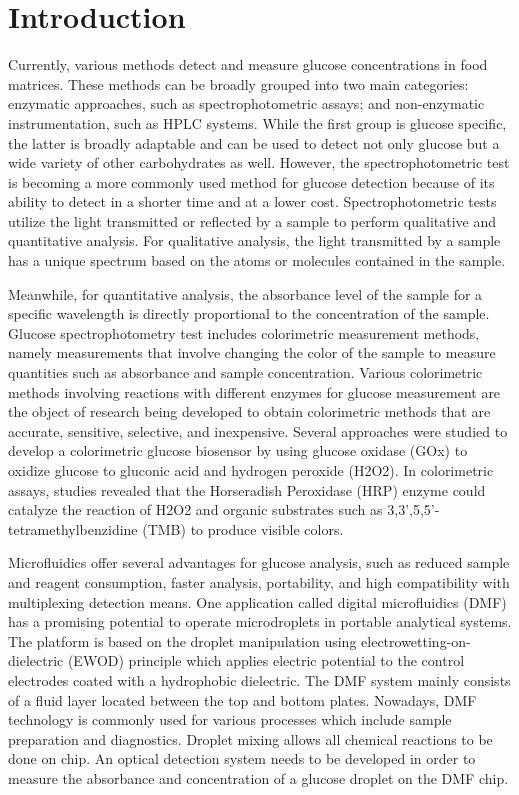 \documentclass[conference]{IEEEtran}
\begin{document}
\section{Introduction}
Currently, various methods detect and measure glucose concentrations in food matrices. These methods can be broadly grouped into two main categories: enzymatic approaches, such as spectrophotometric assays; and non-enzymatic instrumentation, such as HPLC systems. While the first group is glucose specific, the latter is broadly adaptable and can be used to detect not only glucose but a wide variety of other carbohydrates as well. However, the spectrophotometric test is becoming a more commonly used method for glucose detection because of its ability to detect in a shorter time and at a lower cost. Spectrophotometric tests utilize the light transmitted or reflected by a sample to perform qualitative and quantitative analysis. For qualitative analysis, the light transmitted by a sample has a unique spectrum based on the atoms or molecules contained in the sample.  

Meanwhile, for quantitative analysis, the absorbance level of the sample for a specific wavelength is directly proportional to the concentration of the sample. Glucose spectrophotometry test includes colorimetric measurement methods, namely measurements that involve changing the color of the sample to measure quantities such as absorbance and sample concentration. Various colorimetric methods involving reactions with different enzymes for glucose measurement are the object of research being developed to obtain colorimetric methods that are accurate, sensitive, selective, and inexpensive.  Several approaches were studied to develop a colorimetric glucose biosensor by using glucose oxidase (GOx) to oxidize glucose to gluconic acid and hydrogen peroxide (H2O2). In colorimetric assays, studies revealed that the Horseradish Peroxidase (HRP) enzyme could catalyze the reaction of H2O2 and organic substrates such as 3,3',5,5'-tetramethylbenzidine (TMB) to produce visible colors\cite{b1}. 

Microfluidics offer several advantages for glucose analysis, such as reduced sample and reagent consumption, faster analysis, portability, and high compatibility with multiplexing detection means. One application called digital microfluidics (DMF) has a promising potential to operate microdroplets in portable analytical systems. The platform is based on the droplet manipulation using electrowetting-on-dielectric (EWOD) principle which applies electric potential to the control electrodes coated with a hydrophobic dielectric\cite{b2}. The DMF system mainly consists of a fluid layer located between the top and bottom plates. Nowadays, DMF technology is commonly used for various processes which include sample preparation and diagnostics\cite{b3}. Droplet mixing allows all chemical reactions to be done on chip. An optical detection system needs to be developed in order to measure the absorbance and concentration of a glucose droplet on the DMF chip. 
\end{document}
